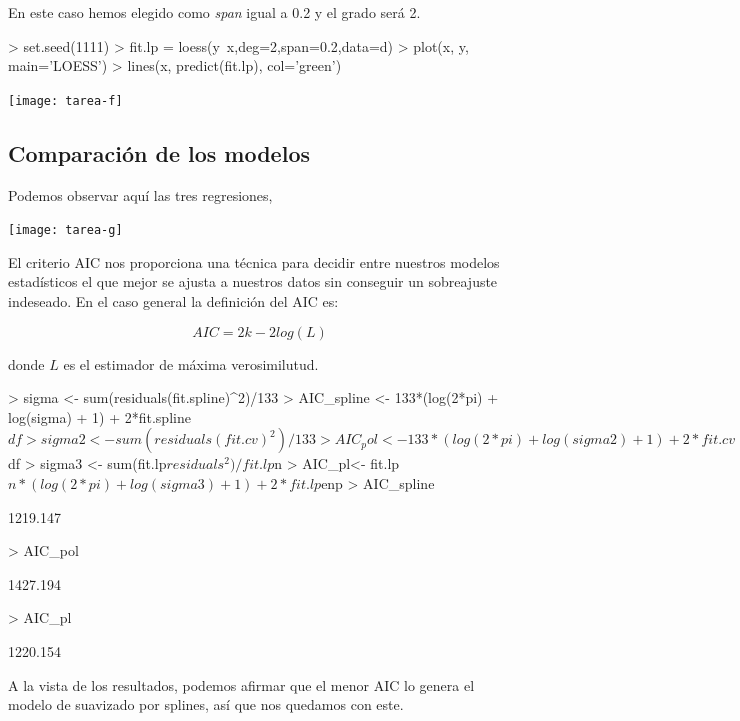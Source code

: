 \documentclass[a4paper,12pt]{article}
\begin{document}
En este caso hemos elegido como \textit{span} igual a 0.2 y el grado será 2. 

\begin{Schunk}
\begin{Sinput}
> set.seed(1111)
> fit.lp = loess(y~x,deg=2,span=0.2,data=d)
> plot(x, y, main='LOESS')
> lines(x, predict(fit.lp), col='green')
\end{Sinput}
\end{Schunk}
\texttt{[image: tarea-f]}

\subsection{Comparación de los modelos}

Podemos observar aquí las tres regresiones,

\texttt{[image: tarea-g]}

El criterio AIC nos proporciona una técnica para decidir entre nuestros modelos estadísticos el que mejor se ajusta a nuestros datos sin conseguir un sobreajuste indeseado. En el caso general la definición del AIC es:

$$ AIC = 2k - 2 log(L)$$

donde $L$ es el estimador de máxima verosimilutud.

\begin{Schunk}
\begin{Sinput}
> sigma <- sum(residuals(fit.spline)^2)/133
> AIC_spline <- 133*(log(2*pi) + log(sigma) + 1) + 2*fit.spline$df
> sigma2 <- sum(residuals(fit.cv)^2)/133
> AIC_pol <- 133*(log(2*pi) + log(sigma2) + 1) + 2*fit.cv$df
> sigma3 <- sum(fit.lp$residuals^2)/fit.lp$n
> AIC_pl<- fit.lp$n*(log(2*pi)+log(sigma3) + 1) + 2 *fit.lp$enp
> AIC_spline
\end{Sinput}
\begin{Soutput}
[1] 1219.147
\end{Soutput}
\begin{Sinput}
> AIC_pol
\end{Sinput}
\begin{Soutput}
[1] 1427.194
\end{Soutput}
\begin{Sinput}
> AIC_pl
\end{Sinput}
\begin{Soutput}
[1] 1220.154
\end{Soutput}
\end{Schunk}

A la vista de los resultados, podemos afirmar que el menor AIC lo genera el modelo de suavizado por splines, así que nos quedamos con este.
\end{document}

